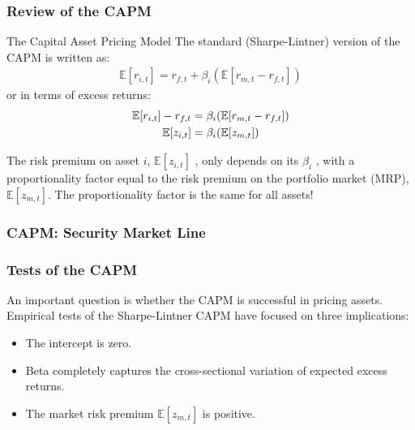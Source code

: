 \documentclass[xcolor=dvipsnames, english, 8pt]{beamer}
\begin{document}
    \begin{frame}
        \frametitle{Review of the CAPM}
        \begin{block}{The Capital Asset Pricing Model}
The standard (Sharpe-Lintner) version of the CAPM is written as:
\begin{align}
    \mathbb{E}[r_{i,t}] = r_{f,t} + \beta_i (\mathbb{E}[r_{m,t} -  r_{f,t}])
\end{align}
    or in terms of excess returns:
    \begin{align}
        \mathbb{E}[r_{i,t}] - r_{f,t} &= \beta_i (\mathbb{E}[r_{m,t} -  r_{f,t}])\notag \\ \mathbb{E}[z_{i,t}] &= \beta_i (\mathbb{E}[z_{m,t} ])
    \end{align}
\end{block}
    The risk premium on asset $i$, $\mathbb{E}[z_{i,t}]$ , only depends on its $\beta_i$ , with a proportionality
    factor equal to the risk premium on the portfolio market (MRP), $\mathbb{E}[z_{m,t}]$. The proportionality
    factor is the same for all assets!

    \end{frame}


    \begin{frame}
    \frametitle{CAPM: Security Market Line}
    \centering
    \begin{adjustbox}{width=\textwidth,height=0.7\textheight,keepaspectratio}
    \end{adjustbox}
    \end{frame}

\begin{frame}
    \frametitle{Tests of the CAPM}
An important question is whether the CAPM is successful in pricing assets. Empirical tests of the Sharpe-Lintner CAPM have focused on three implications:\vspace{0.25cm}\\
\begin{itemize}
    \item The intercept is zero.
    \item Beta completely captures the cross-sectional variation of expected excess returns.
    \item The market risk premium  $\mathbb{E}[z_{m,t}]$ is positive.
\end{itemize}
\end{frame}
\end{document}
